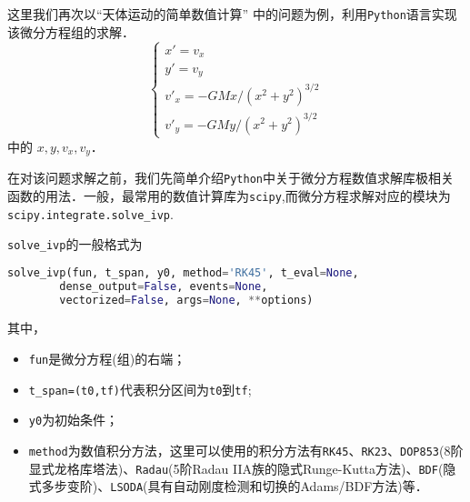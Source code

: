 这里我们再次以“天体运动的简单数值计算” 中的问题为例，利用\verb |Python|语言实现该微分方程组的求解．
\begin{equation}\label{PyIVP_eq}
\begin{cases}
x' = v_x\\
y' = v_y\\
v'_x = -GMx/(x^2 + y^2)^{3/2}\\
v'_y = -GMy/(x^2 + y^2)^{3/2}
\end{cases}
\end{equation}
中的 $x, y, v_x, v_y$．

在对该问题求解之前，我们先简单介绍\verb|Python|中关于微分方程数值求解库极相关函数的用法．一般，最常用的数值计算库为\verb|scipy|,而微分方程求解对应的模块为\verb|scipy.integrate.solve_ivp|.

 \verb|solve_ivp|的一般格式为
 \begin{lstlisting}[language=python]
 solve_ivp(fun, t_span, y0, method='RK45', t_eval=None,
        dense_output=False, events=None, 
        vectorized=False, args=None, **options)
 \end{lstlisting}
 其中，
\begin{itemize}
\item \verb|fun|是微分方程(组)的右端；
\item  \verb|t_span=(t0,tf)|代表积分区间为\verb|t0|到\verb|tf|;
\item  \verb|y0|为初始条件；
\item \verb|method|为数值积分方法，这里可以使用的积分方法有\verb|RK45|、\verb|RK23|、\verb|DOP853|(8阶显式龙格库塔法)、\verb|Radau|(5阶Radau IIA族的隐式Runge-Kutta方法)、\verb|BDF|(隐式多步变阶)、\verb|LSODA|(具有自动刚度检测和切换的Adams/BDF方法)等．
\end{itemize}